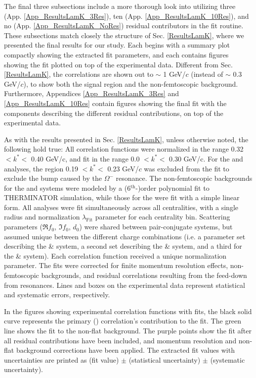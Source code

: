 \documentclass[/home/jesse/Analysis/FemtoAnalysis/AnalysisNotes/AnalysisNoteJBuxton.tex]{subfiles}
\begin{document}
The final three subsections include a more thorough look into utilizing three (App. \ref{App_ResultsLamK_3Res}), ten (App. \ref{App_ResultsLamK_10Res}), and no (App. \ref{App_ResultsLamK_NoRes}) residual contributors in the fit routine.
These subsections match closely the structure of Sec. \ref{ResultsLamK}, where we presented the final results for our \LamK study.
Each begins with a summary plot compactly showing the extracted fit parameters, and each contains figures showing the fit plotted on top of the experimental data.
Different from Sec. \ref{ResultsLamK}, the correlations are shown out to $\sim$ 1 GeV/$c$ (instead of $\sim$ 0.3 GeV/$c$), to show both the signal region and the non-femtoscopic background. 
Furthermore, Appendices \ref{App_ResultsLamK_3Res} and \ref{App_ResultsLamK_10Res} contain figures showing the final fit with the components describing the different residual contributions, on top of the experimental data.

As with the results presented in Sec. \ref{ResultsLamK}, unless otherwise noted, the following hold true:
All correlation functions were normalized in the range 0.32 $< k^{*} <$ 0.40 GeV/c, and fit in the range 0.0 $< k^{*} <$ 0.30 GeV/c.
For the \LamKchM and \ALamKchP analyses, the region 0.19 $< k^{*} <$ 0.23 GeV/$c$ was excluded from the fit to exclude the bump caused by the $\Omega^{-}$ resonance.
The non-femtoscopic backgrounds for the \LamKchP and \LamKchM systems were modeled by a (6$^{\mathrm{th}}$-)order polynomial fit to THERMINATOR simulation, while those for the \LamKs were fit with a simple linear form.
All analyses were fit simultaneously across all centralities, with a single radius and normalization $\lambda_{\mathrm{Fit}}$ parameter for each centrality bin.
Scattering parameters ($\Re f_{0}$, $\Im f_{0}$, $d_{0}$) were shared between pair-conjugate systems, but assumed unique between the different \LamK charge combinations (i.e. a parameter set describing the \LamKchP \& \ALamKchM system, a second set describing the \LamKchM \& \ALamKchP system, and a third for the \LamKs \& \ALamKs system).
Each correlation function received a unique normalization parameter.
The fits were corrected for finite momentum resolution effects, non-femtoscopic backgrounds, and residual correlations resulting from the feed-down from resonances.
Lines and boxes on the experimental data represent statistical and systematic errors, respectively.

In the figures showing experimental correlation functions with fits, the black solid curve represents the primary (\LamK) correlation's contribution to the fit.
The green line shows the fit to the non-flat background.  
The purple points show the fit after all residual contributions have been included, and momentum resolution and non-flat background corrections have been applied.
The extracted fit values with uncertainties are printed as (fit value) $\pm$ (statistical uncertainty) $\pm$ (systematic uncertainty).
\end{document}
